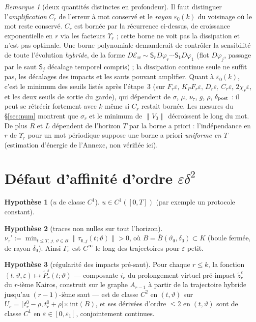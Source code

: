 \documentclass[11pt,a4paper]{article}
\theoremstyle{remark}
\newtheorem{remarque}[theoreme]{Remarque}
\theoremstyle{definition}
\newtheorem{hyp}{Hypothèse}
\newcommand{\norm}[1]{\lVert #1\rVert}
\newcommand{\eps}{\varepsilon}
\newcommand{\vth}{\vartheta}
\newcommand{\zt}{\widetilde z}
\newcommand{\Pt}{\widetilde P}
\begin{document}
\begin{remarque}[deux quantités distinctes en profondeur]
Il faut distinguer l'\emph{amplification} $C_r$ de l'erreur à mot conservé et le \emph{rayon} $\eps_0(k)$ du voisinage où le mot reste conservé. $C_r$ est bornée par la récurrence ci-dessus, de croissance exponentielle en $r$ via les facteurs $\Upsilon_r$ ; cette borne ne voit pas la dissipation et n'est pas optimale. Une borne polynomiale demanderait de contrôler la sensibilité de toute l'évolution \emph{hybride}, de la forme $D\mathcal E_w\sim\mathsf S_rD\varphi_r\cdots\mathsf S_1D\varphi_1$ (flot $D\varphi_j$, passage par le saut $\mathsf S_j$ décalage temporel compris) ; la dissipation continue seule ne suffit pas, les décalages des impacts et les sauts pouvant amplifier. Quant à $\eps_0(k)$, c'est le minimum des seuils listés après l'étape~3 (sur $F_r\eps$, $K_PF_r\eps$, $D_r\eps$, $C_r\eps$, $2\chi_r\eps$, et les deux seuils de sortie du garde), qui dépendent de $\sigma$, $\mu$, $\nu_\tau$, $g$, $\rho$, $\delta_{\rm post}$ : il peut se rétrécir fortement avec $k$ même si $C_r$ restait bornée. Les mesures du §\ref{sec:num} montrent que $\sigma_r$ et le minimum de $\norm{V_0}$ décroissent le long du mot. De plus $R$ et $L$ dépendent de l'horizon $T$ par la borne a priori : l'indépendance en $r$ de $\Upsilon_r$ pour un mot périodique suppose une borne a priori \emph{uniforme en $T$} (estimation d'énergie de l'Annexe, non vérifiée ici).
\end{remarque}

\section{Défaut d'affinité d'ordre $\eps\delta^2$}\label{sec:aff}

\begin{hyp}[$u$ de classe $C^1$]\label{h:u} $u\in C^1([0,T])$ (par exemple un protocole constant).\end{hyp}
\begin{hyp}[traces non nulles sur tout l'horizon]\label{h:tn} $\nu_\tau':=\min_{t\le T,\,j,\,\vth\in B}\norm{\tau_{0,j}(t;\vth)}>0$, où $B=\bar B(\vth_0,\delta_0)\subset K$ (boule fermée, de rayon $\delta_0$). Ainsi $\Gamma_\eps$ est $C^\infty$ le long des trajectoires pour $\eps$ petit.\end{hyp}
\begin{hyp}[régularité des impacts pré-saut]\label{h:P2}
Pour chaque $r\le k$, la fonction $(t,\vth,\eps)\mapsto\Pt^\eps_r(t;\vth)$ --- composante $i_r$ du prolongement virtuel pré-impact $\zt^\eps_r$ du $r$-ième Kairos, construit sur le graphe $A_{r-1}$ à partir de la trajectoire hybride jusqu'au $(r-1)$-ième saut --- est de classe $C^2$ en $(t,\vth)$ sur $U_r=\,]t_r^0-\rho,t_r^0+\rho[\times\,\mathrm{int}(B)$, et ses dérivées d'ordre $\le2$ en $(t,\vth)$ sont de classe $C^1$ en $\eps\in[0,\eps_1]$, conjointement continues.
\end{hyp}
\end{document}
